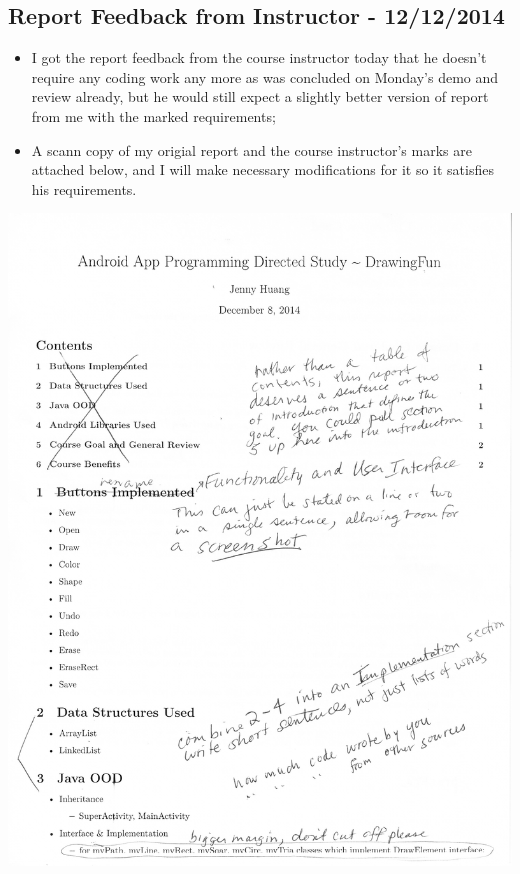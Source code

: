 \documentclass[9pt,b5paper]{article}
\begin{document}
\subsection{Report Feedback from Instructor - 12/12/2014}
\label{sec-7-3}
\begin{itemize}
\item I got the report feedback from the course instructor today that he doesn't require any coding work any more as was concluded on Monday's demo and review already, but he would still expect a slightly better version of report from me with the marked requirements;
\item A scann copy of my origial report and the course instructor's marks are attached below, and I will make necessary modifications for it so it satisfies his requirements.
\end{itemize}
\includegraphics[width=.9\linewidth]{./IMG_0001.jpg}
\end{document}
